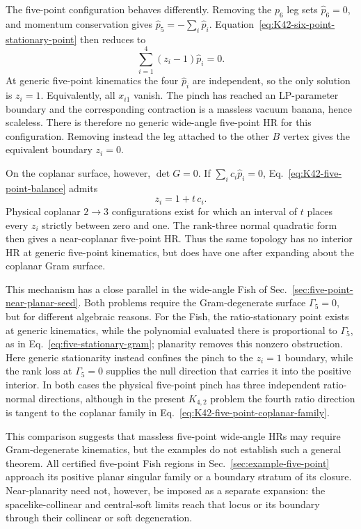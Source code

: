 \documentclass[a4paper,11pt]{article}
\begin{document}
The five-point configuration behaves differently.  Removing the \(p_6\) leg
sets \(\widehat p_6=0\), and momentum conservation gives
\(\widehat p_5=-\sum_i\widehat p_i\).
Equation~\eqref{eq:K42-six-point-stationary-point}
then reduces to
\begin{equation}
 \sum_{i=1}^4(z_i-1)\widehat p_i=0.
 \label{eq:K42-five-point-balance}
\end{equation}
At generic five-point kinematics the four \(\widehat p_i\) are independent, so the
only solution is \(z_i=1\).  Equivalently, all \(x_{i1}\) vanish.  The pinch
has reached an LP-parameter boundary and the corresponding contraction is a
massless vacuum banana, hence scaleless.  There is therefore no generic
wide-angle five-point HR for this configuration.  Removing instead the leg
attached to the other \(B\) vertex gives the equivalent boundary \(z_i=0\).

On the coplanar surface, however, \(\det G=0\).  If
\(\sum_i c_i\widehat p_i=0\),
Eq.~\eqref{eq:K42-five-point-balance} admits
\begin{equation}
 z_i=1+t\,c_i .
 \label{eq:K42-five-point-coplanar-family}
\end{equation}
Physical coplanar \(2\to3\) configurations exist for which an interval of
\(t\) places every \(z_i\) strictly between zero and one.  The rank-three
normal quadratic form then gives a near-coplanar five-point HR.  Thus the
same topology has no interior HR at generic five-point kinematics, but does
have one after expanding about the coplanar Gram surface.

This mechanism has a close parallel in the wide-angle Fish of
Sec.~\ref{sec:five-point-near-planar-seed}.  Both problems require the
Gram-degenerate surface \(\Gamma_5=0\), but for different algebraic reasons.
For the Fish, the ratio-stationary point exists at generic kinematics, while
the polynomial evaluated there is proportional to \(\Gamma_5\), as in
Eq.~\eqref{eq:five-stationary-gram}; planarity removes this nonzero
obstruction.  Here generic stationarity instead confines the pinch to the
\(z_i=1\) boundary, while the rank loss at \(\Gamma_5=0\) supplies the null
direction that carries it into the positive interior.  In both cases the
physical five-point pinch has three independent ratio-normal directions,
although in the present \(K_{4,2}\) problem the fourth ratio direction is
tangent to the coplanar family in Eq.~\eqref{eq:K42-five-point-coplanar-family}.

This comparison suggests that massless five-point wide-angle HRs may require
Gram-degenerate kinematics, but the examples do not establish such a general
theorem.  All certified five-point Fish regions in Sec.~\ref{sec:example-five-point}
approach its positive planar singular family or a boundary stratum of its
closure.  Near-planarity need not, however, be imposed as a separate
expansion: the spacelike-collinear and central-soft limits reach that locus
or its boundary through their collinear or soft degeneration.
\end{document}
